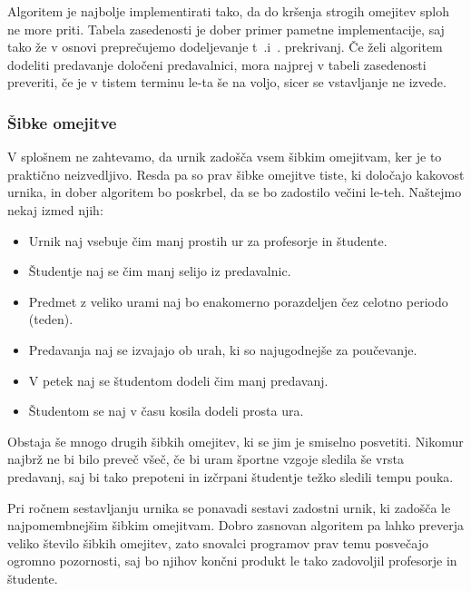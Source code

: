 \documentclass[a4paper, 10pt]{article}
\begin{document}
Algoritem je najbolje implementirati tako, da do kršenja strogih omejitev sploh ne more priti.
Tabela zasedenosti je dober primer pametne implementacije, saj tako že v osnovi  preprečujemo
dodeljevanje t~.i~. prekrivanj. Če želi algoritem dodeliti predavanje določeni predavalnici,
mora najprej v tabeli zasedenosti preveriti, če je v tistem terminu le-ta še na voljo,
sicer se vstavljanje ne izvede.

\subsubsection{Šibke omejitve }%

V splošnem ne zahtevamo, da urnik zadošča vsem šibkim omejitvam, ker je to praktično neizvedljivo.
Resda pa so prav šibke omejitve tiste, ki določajo kakovost urnika, in dober algoritem bo
poskrbel, da se bo zadostilo večini le-teh. Naštejmo nekaj izmed njih:

  \begin{itemize}
	\item  Urnik naj vsebuje čim manj prostih ur za profesorje in študente.
   \item Študentje naj se čim manj selijo iz predavalnic.
   \item Predmet z veliko urami naj bo enakomerno porazdeljen čez celotno periodo (teden).
   \item Predavanja naj se izvajajo ob urah, ki so najugodnejše za poučevanje.
   \item V petek naj se študentom dodeli čim manj predavanj.
   \item Študentom se naj v času kosila dodeli prosta ura.
\end{itemize}
%
Obstaja še mnogo drugih šibkih omejitev, ki se jim je smiselno posvetiti. Nikomur najbrž ne
bi bilo preveč všeč, če bi uram športne vzgoje sledila še vrsta predavanj, saj bi tako
prepoteni in izčrpani študentje težko sledili tempu pouka.

Pri ročnem sestavljanju urnika se ponavadi sestavi zadostni urnik, ki zadošča le
najpomembnejšim šibkim omejitvam. Dobro zasnovan algoritem pa lahko preverja veliko
število šibkih omejitev, zato snovalci programov prav temu posvečajo ogromno pozornosti,
saj bo njihov končni produkt le tako zadovoljil profesorje in študente.
\end{document}
